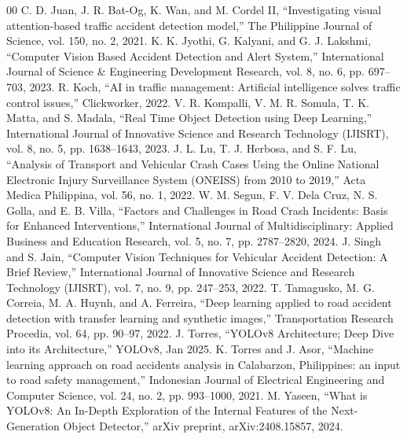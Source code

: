\documentclass[conference]{IEEEtran}
\begin{document}
\begin{thebibliography}{00}
 C. D. Juan, J. R. Bat-Og, K. Wan, and M. Cordel II, ``Investigating visual attention-based traffic accident detection model,'' The Philippine Journal of Science, vol. 150, no. 2, 2021.
 K. K. Jyothi, G. Kalyani, and G. J. Lakshmi, ``Computer Vision Based Accident Detection and Alert System,'' International Journal of Science \& Engineering Development Research, vol. 8, no. 6, pp. 697--703, 2023.
 R. Koch, ``AI in traffic management: Artificial intelligence solves traffic control issues,'' Clickworker, 2022.
 V. R. Kompalli, V. M. R. Somula, T. K. Matta, and S. Madala, ``Real Time Object Detection using Deep Learning,'' International Journal of Innovative Science and Research Technology (IJISRT), vol. 8, no. 5, pp. 1638--1643, 2023.
 J. L. Lu, T. J. Herbosa, and S. F. Lu, ``Analysis of Transport and Vehicular Crash Cases Using the Online National Electronic Injury Surveillance System (ONEISS) from 2010 to 2019,'' Acta Medica Philippina, vol. 56, no. 1, 2022.
 W. M. Segun, F. V. Dela Cruz, N. S. Golla, and E. B. Villa, ``Factors and Challenges in Road Crash Incidents: Basis for Enhanced Interventions,'' International Journal of Multidisciplinary: Applied Business and Education Research, vol. 5, no. 7, pp. 2787--2820, 2024.
 J. Singh and S. Jain, ``Computer Vision Techniques for Vehicular Accident Detection: A Brief Review,'' International Journal of Innovative Science and Research Technology (IJISRT), vol. 7, no. 9, pp. 247--253, 2022.
 T. Tamagusko, M. G. Correia, M. A. Huynh, and A. Ferreira, ``Deep learning applied to road accident detection with transfer learning and synthetic images,'' Transportation Research Procedia, vol. 64, pp. 90--97, 2022.
 J. Torres, ``YOLOv8 Architecture; Deep Dive into its Architecture,'' YOLOv8, Jan 2025.
 K. Torres and J. Asor, ``Machine learning approach on road accidents analysis in Calabarzon, Philippines: an input to road safety management,'' Indonesian Journal of Electrical Engineering and Computer Science, vol. 24, no. 2, pp. 993--1000, 2021.
 M. Yaseen, ``What is YOLOv8: An In-Depth Exploration of the Internal Features of the Next-Generation Object Detector,'' arXiv preprint, arXiv:2408.15857, 2024.
\end{thebibliography}
\end{document}
